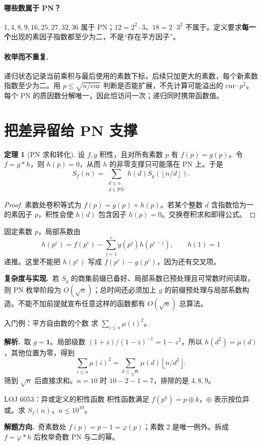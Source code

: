 \documentclass[UTF8,a4paper,11pt,oneside,openany,fontset=fandol]{ctexbook}
\theoremstyle{definition}
\newtheorem{theorem}[definition]{定理}
\newcommand{\one}{\mathbf 1}
\newcommand{\floor}[1]{\left\lfloor #1\right\rfloor}
\newcommand{\sol}{\par\noindent\textbf{解析.}\ }
\newcommand{\hint}{\par\noindent\textbf{解题方向.}\ }
\newcommand{\cost}{\par\noindent\textbf{复杂度与实现.}\ }
\begin{document}
\paragraph{哪些数属于 PN？}
$1,4,8,9,16,25,27,32,36$ 属于 PN；$12=2^2\cdot3$、$18=2\cdot3^2$ 不属于。定义要求\textbf{每一个}出现的素因子指数都至少为二，不是“存在平方因子”。
\paragraph{枚举而不重复.} 递归状态记录当前乘积与最后使用的素数下标，后续只加更大的素数，每个新素数指数至少为二。用 $p\le\sqrt{n/\text{cur}}$ 判断是否能扩展，不先计算可能溢出的 $\text{cur}\cdot p^2$。每个 PN 的质因数分解唯一，因此恰访问一次；递归同时携带函数值。


\section{把差异留给 PN 支撑}
\begin{theorem}[PN 求和转化]
设 $f,g$ 积性，且对所有素数 $p$ 有 $f(p)=g(p)$。令 $f=g*h$，则 $h(p)=0$，从而 $h$ 的非零支撑只可能落在 PN 上。于是
\[
 S_f(n)=\sum_{\substack{d\le n\\d\in\mathrm{PN}}}h(d)S_g(\floor{n/d}).
\]
\end{theorem}

\begin{proof}
素数处卷积等式为 $f(p)=g(p)+h(p)$。若某个整数 $d$ 含指数恰为一的素因子 $p$，积性会使 $h(d)$ 包含因子 $h(p)=0$。交换卷积求和即得公式。
\end{proof}
固定素数 $p$，局部系数由
\[
 h(p^e)=f(p^e)-\sum_{j=1}^e g(p^j)h(p^{e-j}),\qquad h(1)=1
\]
递推。这里不能把 $h(p^e)$ 写成 $f(p^e)-g(p^e)$，因为还有交叉项。
\cost 若 $S_g$ 的商集前缀已备好、局部系数已预处理且可常数时间读取，则 PN 枚举阶段为 $O(\sqrt n)$；总时间还必须加上 $g$ 的前缀预处理与局部系数构造。不能不加前提就宣布任意这样的函数都有 $O(\sqrt n)$ 总算法。

\begin{problem}{入门例：平方自由数的个数}
求 $\sum_{i\le n}\mu(i)^2$。
\end{problem}
\sol 取 $g=\one$。局部级数 $(1+z)/(1-z)^{-1}=1-z^2$，所以 $h(d^2)=\mu(d)$，其他位置为零，得到
\[
 \sum_{i\le n}\mu(i)^2=\sum_{d\le\sqrt n}\mu(d)\floor{n/d^2}.
\]
筛到 $\sqrt n$ 后直接求和。$n=10$ 时 $10-2-1=7$，排除的是 $4,8,9$。


\begin{problem}{LOJ 6053：异或定义的积性函数}
积性函数满足 $f(p^k)=p\mathbin{\oplus}k$，$\oplus$ 表示按位异或。求 $S_f(n)$，$n\le10^{10}$。
\end{problem}
\hint 奇素数处 $f(p)=p-1=\varphi(p)$；素数 $2$ 是唯一例外。拆成 $f=\varphi*h$ 后枚举奇数 PN 与二的幂。
\end{document}
